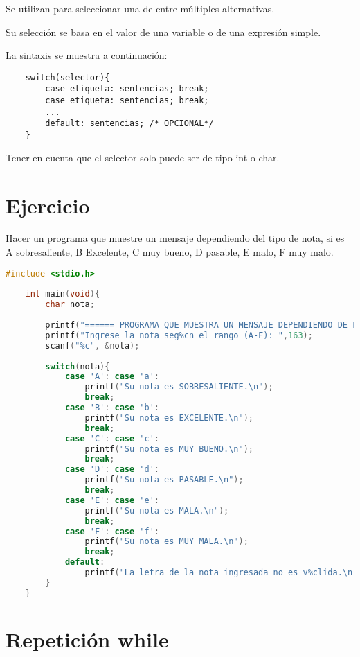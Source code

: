 Se utilizan para seleccionar una de entre múltiples alternativas.

\vspace{1em}
Su selección se basa en el valor de una variable o de una expresión simple.

\vspace{1em}
La sintaxis se muestra a continuación:

\begin{verbatim}
	switch(selector){
		case etiqueta: sentencias; break;
		case etiqueta: sentencias; break;
		...
		default: sentencias; /* OPCIONAL*/
	}
\end{verbatim}

\vspace{1em}
{Tener en cuenta que el selector solo puede ser de tipo int o char.}

\section [Ejercicio]{Ejercicio}
Hacer un programa que muestre un mensaje dependiendo del tipo de nota, si es A sobresaliente, B Excelente, C muy bueno, D pasable, E malo, F muy malo.

\begin{lstlisting}[language=C, caption={Mostrar mensaje según la nota}, style=codigoenc]
	#include <stdio.h>
	
	int main(void){
		char nota;
		
		printf("====== PROGRAMA QUE MUESTRA UN MENSAJE DEPENDIENDO DE LA NOTA ======\n\n");
		printf("Ingrese la nota seg%cn el rango (A-F): ",163);
		scanf("%c", &nota);
		
		switch(nota){
			case 'A': case 'a':
				printf("Su nota es SOBRESALIENTE.\n");
				break;
			case 'B': case 'b':
				printf("Su nota es EXCELENTE.\n");
				break;
			case 'C': case 'c':
				printf("Su nota es MUY BUENO.\n");
				break;
			case 'D': case 'd':
				printf("Su nota es PASABLE.\n");
				break;
			case 'E': case 'e':
				printf("Su nota es MALA.\n");
				break;
			case 'F': case 'f':
				printf("Su nota es MUY MALA.\n");
				break;
			default:
				printf("La letra de la nota ingresada no es v%clida.\n", 160);
		}
	}
\end{lstlisting}


\section [Repetición while]{Repetición while}

